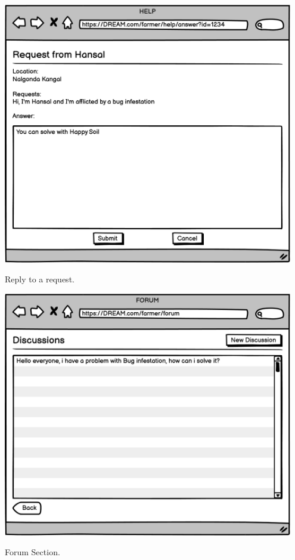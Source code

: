 \vspace{0.5cm}
\begin{minipage}{.5\textwidth}
	\centering
	\includegraphics[width=0.95\textwidth]{Images/Mockup/Farmer/07FarmerHelpAnswer.png}
	\captionsetup{type=figure}
	\caption{Reply to a request.}
\end{minipage}%
\begin{minipage}{.5\textwidth}
	\centering
	\includegraphics[width=0.95\textwidth]{Images/Mockup/Farmer/08FarmerForum.png}
	\captionsetup{type=figure}
	\caption{Forum Section.}
\end{minipage}
